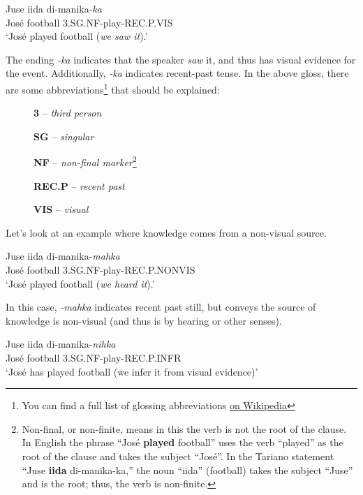 \documentclass[12pt]{book}
\begin{document}
\begin{exe}
\ex 
\gll Juse i{\textfishhookr}ida di-manika-\emph{ka}\\
Jos{\'e} football 3.SG.NF-play-REC.P.VIS\\
\trans `Jos{\'e} played football (\textit{we saw it}).'
\end{exe}

The ending \emph{-ka} indicates that the speaker \textit{saw} it, and thus has visual evidence for the event. Additionally, \emph{-ka} indicates recent-past tense.
In the above gloss, there are some abbreviations\footnote{You can find a full list of glossing abbreviations \href{https://en.wikipedia.org/wiki/List\_of\_glossing\_abbreviations}{on Wikipedia}} that should be explained:

\begin{description}
	\item[ ] \textbf{3} -- \emph{third person}
	\item[ ] \textbf{SG} -- \emph{singular}
	\item[ ] \textbf{NF} -- \emph{non-final marker}\footnote{Non-final, or non-finite, means in this the verb is not the root of the clause. In English the phrase ``Jos{\'e} \textbf{played} football'' uses the verb ``played'' as the root of the clause and takes the subject ``Jos{\'e}''. In the Tariano statement ``Juse \textbf{i{\textfishhookr}ida} di-manika-ka,'' the noun ``i{\textfishhookr}ida'' (football) takes the subject ``Juse'' and is the root; thus, the verb is non-finite.} 
	\item[ ] \textbf{REC.P} -- \emph{recent past}
	\item[ ] \textbf{VIS} -- \emph{visual} 
\end{description}

Let's look at an example where knowledge comes from a non-visual source.

\begin{exe}
\ex 
\gll Juse i{\textfishhookr}ida di-manika-\emph{mahka}\\
Jos{\'e} football 3.SG.NF-play-REC.P.NONVIS\\
\trans `Jos{\'e} played football (\textit{we heard it}).'
\end{exe}

In this case, \emph{-mahka} indicates recent past still, but conveys the source of knowledge is non-visual (and thus is by hearing or other senses).

\begin{exe}
\ex
\gll Juse i{\textfishhookr}ida di-manika-\emph{nihka}\\
Jos{\'e} football 3.SG.NF-play-REC.P.INFR\\
\trans `Jos{\'e} has played football (we infer it from visual evidence)'
\end{exe}
\end{document}
